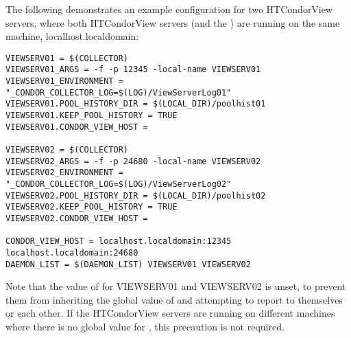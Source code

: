 The following demonstrates an example configuration for two HTCondorView servers,
where both HTCondorView servers (and the ) are running on the
same machine, localhost.localdomain:

\footnotesize
\begin{verbatim}
VIEWSERV01 = $(COLLECTOR)
VIEWSERV01_ARGS = -f -p 12345 -local-name VIEWSERV01
VIEWSERV01_ENVIRONMENT = "_CONDOR_COLLECTOR_LOG=$(LOG)/ViewServerLog01"
VIEWSERV01.POOL_HISTORY_DIR = $(LOCAL_DIR)/poolhist01
VIEWSERV01.KEEP_POOL_HISTORY = TRUE
VIEWSERV01.CONDOR_VIEW_HOST =

VIEWSERV02 = $(COLLECTOR)
VIEWSERV02_ARGS = -f -p 24680 -local-name VIEWSERV02
VIEWSERV02_ENVIRONMENT = "_CONDOR_COLLECTOR_LOG=$(LOG)/ViewServerLog02"
VIEWSERV02.POOL_HISTORY_DIR = $(LOCAL_DIR)/poolhist02
VIEWSERV02.KEEP_POOL_HISTORY = TRUE
VIEWSERV02.CONDOR_VIEW_HOST =

CONDOR_VIEW_HOST = localhost.localdomain:12345 localhost.localdomain:24680
DAEMON_LIST = $(DAEMON_LIST) VIEWSERV01 VIEWSERV02
\end{verbatim}
\normalsize

Note that the value of  for VIEWSERV01 and VIEWSERV02
is unset, to prevent them from inheriting the global value of
 and attempting to report to themselves 
or each other.  If the HTCondorView servers are running on different machines where
there is no global value for , this precaution
is not required.
